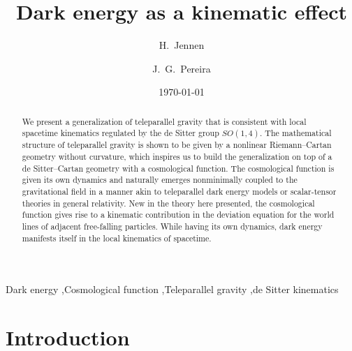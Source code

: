 \documentclass[%
5p,
times,
sort&compress
]{elsarticle}
\begin{document}
\title{Dark energy as a kinematic effect}

\author[ift]{H.~Jennen}

\author[ift]{J.~G.~Pereira}


\address[ift]{%
  Instituto de F\'{\i}sica Te\'orica, UNESP - Universidade 
  Estadual Paulista, \\
  Rua Dr.~Bento Teobaldo Ferraz, 271 -- Bl.~II, 01140-070, S\~ao 
  Paulo, SP,  Brazil
}
\date{\today}

\begin{abstract}
We present a generalization of teleparallel gravity that is 
consistent with local spacetime kinematics regulated by the de 
Sitter group $SO(1,4)$. The mathematical structure of 
teleparallel gravity is shown to be given by a nonlinear 
Riemann--Cartan geometry without curvature, which inspires us to 
build the generalization on top of a de Sitter--Cartan geometry 
with a cosmological function. The cosmological function is given 
its own dynamics and naturally emerges nonminimally coupled to 
the gravitational field in a manner akin to teleparallel dark 
energy models or scalar-tensor theories in general relativity.  
New in the theory here presented, the cosmological function gives 
rise to a kinematic contribution in the deviation equation for 
the world lines of adjacent free-falling particles. While having 
its own dynamics, dark energy manifests itself in the local 
kinematics of spacetime.
\end{abstract}

\begin{keyword}
Dark energy \sep Cosmological function \sep Teleparallel gravity 
\sep de Sitter kinematics
\end{keyword}

\maketitle

\section{Introduction}
\end{document}
